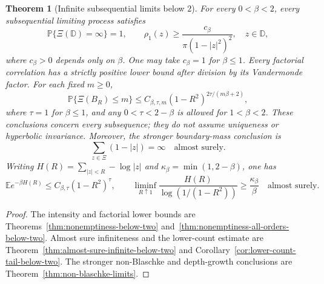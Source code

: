 \documentclass[11pt,a4paper]{article}
\numberwithin{equation}{section}
\newtheorem{theorem}{Theorem}[section]
\theoremstyle{definition}
\theoremstyle{remark}
\newcommand{\D}{\mathbb D}
\begin{document}
\begin{theorem}[Infinite subsequential limits below $2$]
\label{thm:front-infinite-below-two}
For every $0<\beta<2$, every subsequential limiting process satisfies
\[
 \mathbb P\{\Xi(\D)=\infty\}=1,\qquad
 \rho_1(z)\ge\frac{c_\beta}{\pi(1-|z|^2)^2},\quad z\in\D,
\]
where $c_\beta>0$ depends only on $\beta$. One may take $c_\beta=1$
for $\beta\le1$. Every factorial correlation has a strictly positive
lower bound after division by its Vandermonde factor. For each fixed
$m\ge0$,
\[
 \mathbb P\{\Xi(B_R)\le m\}
 \le C_{\beta,\tau,m}(1-R^2)^{2\tau/(m\beta+2)},
\]
where $\tau=1$ for $\beta\le1$, and any $0<\tau<2-\beta$ is
allowed for $1<\beta<2$. These conclusions concern every subsequence;
they do not assume uniqueness or hyperbolic invariance.
Moreover, the stronger boundary-mass conclusion is
\[
 \sum_{z\in\Xi}(1-|z|)=\infty\quad\text{almost surely}.
\]
Writing $H(R)=\sum_{|z|<R}-\log|z|$ and
$\kappa_\beta=\min(1,2-\beta)$, one has
\[
 \mathbb E e^{-\beta H(R)}\le C_{\beta,\tau}(1-R^2)^\tau,
 \qquad
 \liminf_{R\uparrow1}\frac{H(R)}{\log(1/(1-R^2))}
 \ge\frac{\kappa_\beta}{\beta}\quad\text{almost surely}.
\]
\end{theorem}
\begin{proof}
The intensity and factorial lower bounds are
Theorems~\ref{thm:nonemptiness-below-two}
and~\ref{thm:nonemptiness-all-orders-below-two}. Almost sure
infiniteness and the lower-count estimate are
Theorem~\ref{thm:almost-sure-infinite-below-two}
and Corollary~\ref{cor:lower-count-tail-below-two}.
The stronger non-Blaschke and depth-growth conclusions are
Theorem~\ref{thm:non-blaschke-limits}.
\end{proof}
\end{document}

